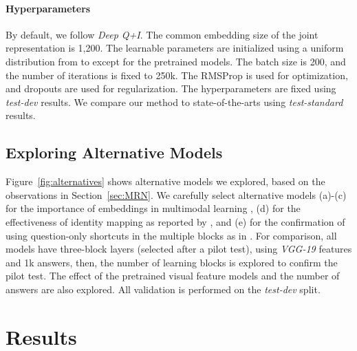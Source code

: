 \documentclass{article}
\begin{document}
\paragraph{Hyperparameters}

By default, we follow \textit{Deep Q+I}. The common embedding size of the joint representation is 1,200. The learnable parameters are initialized using a uniform distribution from  to  except for the pretrained models. The batch size is 200, and the number of iterations is fixed to 250k. The RMSProp \cite{Tieleman2012} is used for optimization, and dropouts \cite{Hinton2012,Gal2015} are used for regularization. The hyperparameters are fixed using \textit{test-dev} results. We compare our method to state-of-the-arts using \textit{test-standard} results.

\subsection{Exploring Alternative Models}
\label{subsec:alternatives}

Figure~\ref{fig:alternatives} shows alternative models we explored, based on the observations in Section~\ref{sec:MRN}. We carefully select alternative models (a)-(c) for the importance of embeddings in multimodal learning \cite{Ngiam2011,srivastava12mm}, (d) for the effectiveness of identity mapping as reported by \cite{He2015}, and (e) for the confirmation of using question-only shortcuts in the multiple blocks as in \cite{Yang2015}. For comparison, all models have three-block layers (selected after a pilot test), using \textit{VGG-19} features and 1k answers, then, the number of learning blocks is explored to confirm the pilot test. The effect of the pretrained visual feature models and the number of answers are also explored. All validation is performed on the \textit{test-dev} split.

\section{Results}
\label{sec:results}
\end{document}
